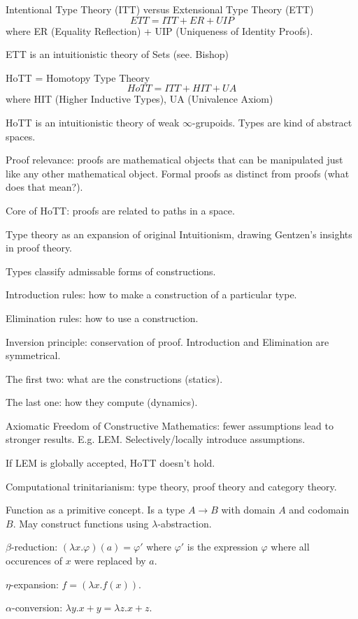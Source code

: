 \documentclass[12pt,a4paper]{article}
\theoremstyle{definition}
\begin{document}
Intentional Type Theory (ITT) versus Extensional Type Theory (ETT)
\[
ETT = ITT + ER + UIP
\]
where ER (Equality Reflection) + UIP (Uniqueness of Identity Proofs).

ETT is an intuitionistic theory of Sets (see. Bishop)

HoTT = Homotopy Type Theory
\[
HoTT = ITT + HIT + UA
\]
where HIT (Higher Inductive Types), UA (Univalence Axiom)

HoTT is an intuitionistic theory of weak $\infty$-grupoids. Types are kind of abstract spaces.

Proof relevance: proofs are mathematical objects that can be manipulated just like any other mathematical object. Formal proofs as distinct from proofs (what does that mean?).

Core of HoTT: proofs are related to paths in a space.

Type theory as an expansion of original Intuitionism, drawing Gentzen's insights in proof theory.

Types classify admissable forms of constructions.

Introduction rules: how to make a construction of a particular type.

Elimination rules: how to use a construction.

Inversion principle: conservation of proof. Introduction and Elimination are symmetrical.

The first two: what are the constructions (statics).

The last one: how they compute (dynamics).

Axiomatic Freedom of Constructive Mathematics: fewer assumptions lead to stronger results. E.g. LEM. Selectively/locally introduce assumptions.

If LEM is globally accepted, HoTT doesn't hold.

Computational trinitarianism: type theory, proof theory and category theory.

Function as a primitive concept. Is a type $A \longrightarrow B$ with domain $A$ and codomain $B$. May construct functions using $\lambda$-abstraction.

$\beta$-reduction: $(\lambda x . \varphi)(a) = \varphi'$ where $\varphi'$ is the expression $\varphi$ where all occurences of $x$ were replaced by $a$.

$\eta$-expansion: $f = (\lambda x . f(x))$.

$\alpha$-conversion: $\lambda y . x + y = \lambda z . x + z$.
\end{document}
